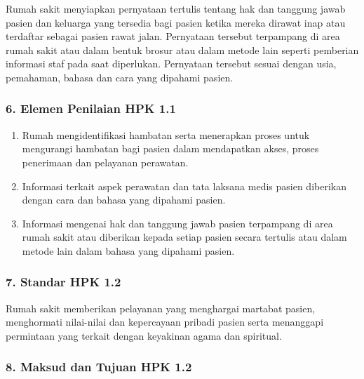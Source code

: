 \documentclass[
]{book}
\providecommand{\tightlist}{%
  \setlength{\itemsep}{0pt}\setlength{\parskip}{0pt}}
\begin{document}
Rumah sakit menyiapkan pernyataan tertulis tentang hak dan tanggung jawab pasien dan keluarga yang tersedia bagi pasien ketika mereka dirawat inap atau terdaftar sebagai pasien rawat jalan. Pernyataan tersebut terpampang di area rumah sakit atau dalam bentuk brosur atau dalam metode lain seperti pemberian informasi staf pada saat diperlukan. Pernyataan tersebut sesuai dengan usia, pemahaman, bahasa dan cara yang dipahami pasien.

\hypertarget{elemen-penilaian-hpk-1.1}{%
\subsubsection*{6. Elemen Penilaian HPK 1.1}\label{elemen-penilaian-hpk-1.1}}

\begin{enumerate}
\def\labelenumi{\alph{enumi}.}
\tightlist
\item
  Rumah mengidentifikasi hambatan serta menerapkan proses untuk mengurangi hambatan bagi pasien dalam mendapatkan akses, proses penerimaan dan pelayanan perawatan.
\item
  Informasi terkait aspek perawatan dan tata laksana medis pasien diberikan dengan cara dan bahasa yang dipahami pasien.
\item
  Informasi mengenai hak dan tanggung jawab pasien terpampang di area rumah sakit atau diberikan kepada setiap pasien secara tertulis atau dalam metode lain dalam bahasa yang dipahami pasien.
\end{enumerate}

\hypertarget{standar-hpk-1.2}{%
\subsubsection*{7. Standar HPK 1.2}\label{standar-hpk-1.2}}

Rumah sakit memberikan pelayanan yang menghargai martabat pasien, menghormati nilai-nilai dan kepercayaan pribadi pasien serta menanggapi permintaan yang terkait dengan keyakinan agama dan spiritual.

\hypertarget{maksud-dan-tujuan-hpk-1.2}{%
\subsubsection*{8. Maksud dan Tujuan HPK 1.2}\label{maksud-dan-tujuan-hpk-1.2}}
\end{document}

